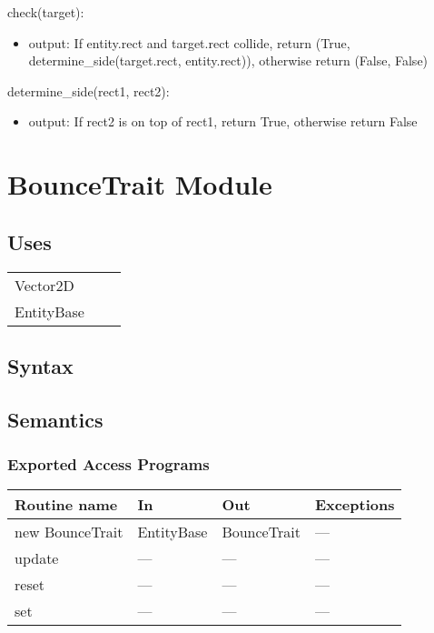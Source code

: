 \documentclass[12pt]{article}
\begin{document}
\noindent check(target):
\begin{itemize}
    \item output: If entity.rect and target.rect collide, return (True, determine\_side(target.rect, entity.rect)), otherwise return (False, False)
\end{itemize}

\noindent determine\_side(rect1, rect2):
\begin{itemize}
    \item output: If rect2 is on top of rect1, return True, otherwise return False
\end{itemize}

\newpage

\section*{BounceTrait Module}

\subsection* {Uses}

\begin{tabular}{lll}
    Vector2D & & \\
    EntityBase & & \\
\end{tabular}

\subsection* {Syntax}

\subsection* {Semantics}

\subsubsection* {Exported Access Programs}

\begin{tabular}{| l | l | l | l |}
\hline
\textbf{Routine name} & \textbf{In} & \textbf{Out} & \textbf{Exceptions}\\
\hline
new BounceTrait & EntityBase & BounceTrait & ---\\
\hline
update & --- & --- & ---\\
\hline
reset & --- & --- & ---\\
\hline
set & --- & --- & ---\\
\hline
\end{tabular}
\end{document}
